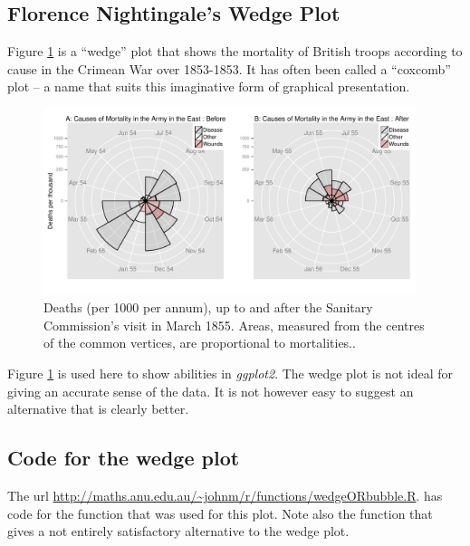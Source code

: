 \newpage
\subsection*{Florence Nightingale's Wedge Plot}\label{sec:wedge}


Figure \ref{col:wedgeplot} is a ``wedge'' plot that shows the
mortality of British troops according to cause in the Crimean War over
1853-1853. It has often been called a ``coxcomb'' plot -- a name that
suits this imaginative form of graphical presentation.

\begin{figure}
\centerline{\includegraphics[width=0.97\textwidth]{colorArt/allwedge}}%
\caption{Deaths (per 1000 per annum), up to and after the
  Sanitary Commission's visit in March 1855.  Areas, measured from the
centres of the common vertices, are proportional
  to mortalities..\label{col:wedgeplot}}
\end{figure}

Figure \ref{col:wedgeplot} is used here to show abilities in
\textit{ggplot2}.  The wedge plot is not ideal for giving an accurate
sense of the data.  It is not however easy to suggest an alternative
that is clearly better.

\subsection*{ Code for the wedge plot}

The url
\url{http://maths.anu.edu.au/~johnm/r/functions/wedgeORbubble.R}. has code for the function  that was
used for this plot.  Note also the function  that
gives a not entirely satisfactory alternative to the wedge plot.

